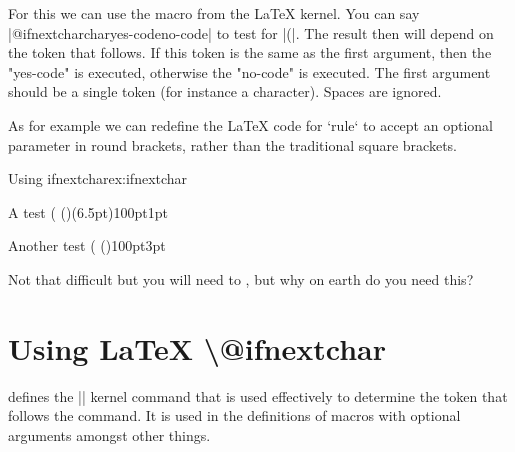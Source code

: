 For this we can use the  macro from the LaTeX kernel.
You can say |@ifnextchar{char}{yes-code}{no-code}| to test for |(|. The result then will depend on the token that follows. If this token is the same as the first argument, then the "yes-code" is executed, otherwise the "no-code" is executed. The first argument should be a single token (for instance a character). Spaces are ignored. 

As for example we can redefine the LaTeX code for `rule` to accept an optional parameter in round brackets, rather than the traditional square brackets.

\begin{texexample}{Using ifnextchar}{ex:ifnextchar}
\makeatletter
\def\Rule{\@ifnextchar(\@Rule%
        {\@Rule(\z@)}}
\def\@Rule(#1)#2#3{%
 \leavevmode
 \hbox{%
 \setlength\@tempdima{#1}%
 \setlength\@tempdimb{#2}%
 \setlength\@tempdimc{#3}%
 \advance\@tempdimc\@tempdima
 \vrule\@width\@tempdimb\@height\@tempdimc\@depth-\@tempdima}}
\makeatother

A test \Rule(6.5pt){100pt}{1pt}

Another test \Rule{100pt}{3pt}

Not that difficult but you will need to , but why on earth do you need this?
\end{texexample}




\begin{comment}
\def\elidebefore[#1]#2{[$\ldots$] #2}
\def\elideafter#1{#1$\ldots$}

\def\elide {%
\futurelet\ifoptions
    \choosemacro
}



\def\choosemacro{%
 \ifx\ifoptions [%
     \let\choice = \elidebefore 
 \else
    \let\choice = \elideafter
 \fi
\choice
}

Testing \elide[b]{Lorem ipsum}

\elide{Lorem Ipsum}

\elide[b]{Lorem ipsum}

\end{comment}


\section{Using LaTeX \protect\textbackslash @ifnextchar}

\latex defines the |\@ifnextchar| kernel command that is used effectively to
determine the token that follows the command. It is used in the definitions
of macros with optional arguments amongst other things.

